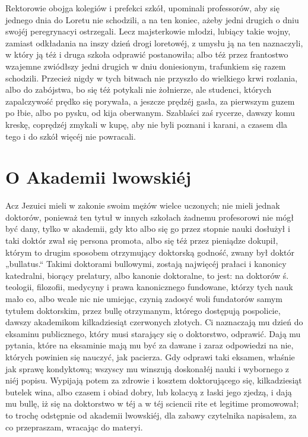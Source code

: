 \documentclass{book}
\begin{document}
Rektorowie obojga kolegiów i prefekci szkół, upominali professorów, aby się jednego dnia do Loretu nie schodzili, a na ten koniec, ażeby jedni drugich o dniu swojéj peregrynacyi ostrzegali. Lecz majsterkowie młodzi, lubiący takie wojny, zamiast odkładania na inszy dzień drogi loretowéj, z umysłu ją na ten naznaczyli, w który ją téż i druga szkoła odprawić postanowiła; albo téż przez frantostwo wzajemne zwiódłszy jedni drugich w dniu doniesionym, trafunkiem się razem schodzili. Przecież nigdy w tych bitwach nie przyszło do wielkiego krwi rozlania, albo do zabójstwa, bo się téż potykali nie żołnierze, ale studenci, których zapalczywość prędko się porywała, a jeszcze prędzéj gasła, za pierwszym guzem po łbie, albo po pysku, od kija oberwanym. Szablaści zaś rycerze, dawszy komu kreskę, coprędzéj zmykali w kupę, aby nie byli poznani i karani, a czasem dla tego i do szkół więcéj nie powracali.

\section{O Akademii lwowskiéj}

Acz Jezuici mieli w zakonie swoim mężów wielce uczonych; nie mieli jednak doktorów, ponieważ ten tytuł w innych szkołach żadnemu profesorowi nie mógł być dany, tylko w akademii, gdy kto albo się go przez stopnie nauki dosłużył i taki doktór zwał się persona promota, albo się téż przez pieniądze dokupił, którym to drugim sposobem otrzymujący doktorską godność, zwany był doktór „bullatus.“ Takimi doktorami bullowymi, zostają najwięcéj prałaci i kanonicy katedralni, biorący prelatury, albo kanonie doktoralne, to jest: na doktorów ś. teologii, filozofii, medycyny i prawa kanonicznego fundowane, którzy tych nauk mało co, albo wcale nic nie umiejąc, czynią zadosyć woli fundatorów samym tytułem doktorskim, przez bullę otrzymanym, którego dostępują pospolicie, dawszy akademikom kilkadziesiąt czerwonych złotych. Ci naznaczają mu dzień do eksaminu publicznego, który musi starający się o doktorstwo, odprawić. Dają mu pytania, które na eksaminie mają mu być za dawane i zaraz odpowiedzi na nie, których powinien się nauczyć, jak pacierza. Gdy odprawi taki eksamen, właśnie jak sprawę kondyktową; wszyscy mu winszują doskonałéj nauki i wybornego z niéj popisu. Wypijają potem za zdrowie i kosztem doktorującego się, kilkadziesiąt butelek wina, albo czasem i obiad dobry, lub kolacyą z łaski jego zjedzą, i dają mu bullę, iż się na doktorstwo w téj a w téj sciencii rite et legitime promowował; to trochę odstępnie od akademii lwowskiéj, dla zabawy czytelnika napisałem, za co przepraszam, wracając do materyi.
\end{document}
